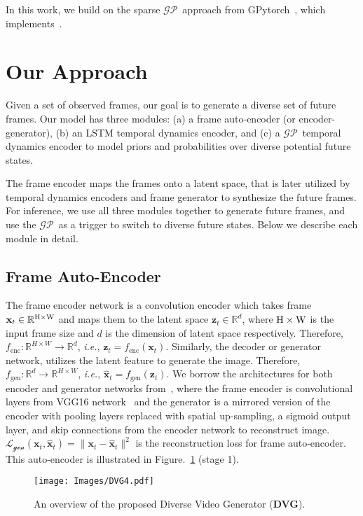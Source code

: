 \documentclass{article} \usepackage{iclr2021_conference,times}
\newcommand{\GP}{$\mathcal{GP}$}
\def\ie{\emph{i.e.}}
\newcommand{\bx}{\mathbf{x}}
\newcommand{\bz}{\mathbf{z}}
\begin{document}
In this work, we build on the sparse \GP\ approach from GPytorch~\citep{gardner2018gpytorch}, which implements~\citep{hensman2013gaussian}.


\section{Our Approach}
\label{sec:approach}
Given a set of observed frames, our goal is to generate a diverse set of future frames. Our model has three modules: (a) a frame auto-encoder (or encoder-generator), (b) an LSTM temporal dynamics encoder, and (c) a \GP\ temporal dynamics encoder to model priors and probabilities over diverse potential future states.

The frame encoder maps the frames onto a latent space, that is later utilized by temporal dynamics encoders and frame generator to synthesize the future frames. For inference, we use all three modules together to generate future frames, and use the \GP\ as a trigger to switch to diverse future states. Below we describe each module in detail.

\vspace{-0.05in}
\subsection{Frame Auto-Encoder} 
\vspace{-0.05in}
The frame encoder network is a convolution encoder which takes frame $\bx_t \in \mathbb{R}^{\rm H\times W}$  and maps them to the latent space $\bz_t \in \mathbb{R}^d$, where ${\rm H\times W}$ is the input frame size and $d$ is the dimension of latent space respectively. Therefore, $f_\text{enc}: \mathbb R^{H\times W}\rightarrow \mathbb R^d$, \ie, $\bz_{t} = f_\text{enc}(\bx_{t})$. Similarly, the decoder or generator network, utilizes the latent feature to generate the image. Therefore, $f_\text{gen}: \mathbb R^d \rightarrow \mathbb R^{H\times W}$, \ie, $\hat{\bx}_{t} = f_\text{gen}(\bz_{t})$. We borrow the architectures for both encoder and generator networks from~\citep{denton2018stochastic}, where the frame encoder is convolutional layers from VGG16 network~\citep{simonyan2015deep} and the generator is a mirrored version of the encoder with pooling layers replaced with spatial up-sampling, a sigmoid output layer, and skip connections from the encoder network to reconstruct image. $\mathcal{L_\text{gen}}(\bx_t, \hat{\bx}_t) = \|\mathbf{x}_{t} - \hat{\mathbf{x}}_{t}\|^2$ is the reconstruction loss for frame auto-encoder. This auto-encoder is illustrated in Figure.~\ref{fig:ours} (stage 1).
\begin{figure}[t]
\texttt{[image: Images/DVG4.pdf]}
\caption{An overview of the proposed Diverse Video Generator (\textbf{DVG}).}
\label{fig:ours}
\vspace{-.2in}
\end{figure}
\vspace{-0.05in}
\end{document}
